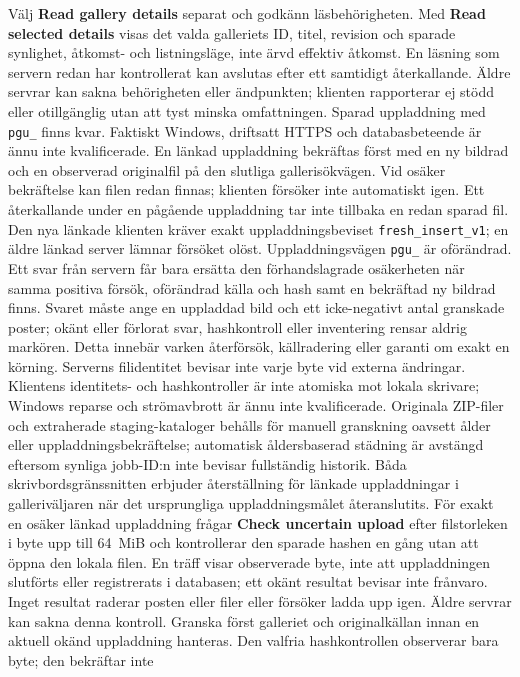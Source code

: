 \documentclass[11pt,a4paper]{article}
\newcommand{\ui}[1]{\textbf{#1}}
\begin{document}
Välj \ui{Read gallery details} separat och godkänn
läsbehörigheten. Med \ui{Read selected details} visas det valda galleriets ID,
titel, revision och sparade synlighet, åtkomst- och listningsläge, inte ärvd
effektiv åtkomst. En läsning som servern redan har kontrollerat kan avslutas
efter ett samtidigt återkallande. Äldre servrar kan sakna behörigheten eller
ändpunkten; klienten rapporterar ej stödd eller otillgänglig utan att tyst
minska omfattningen. Sparad uppladdning med \texttt{pgu\_} finns kvar.
Faktiskt Windows, driftsatt HTTPS och databasbeteende är ännu inte
kvalificerade.
En länkad uppladdning bekräftas först med en ny bildrad och en observerad
originalfil på den slutliga gallerisökvägen. Vid osäker bekräftelse kan filen
redan finnas; klienten försöker inte automatiskt igen. Ett återkallande under
en pågående uppladdning tar inte tillbaka en redan sparad fil.
Den nya länkade klienten kräver exakt uppladdningsbeviset
\texttt{fresh\_insert\_v1}; en äldre länkad server lämnar försöket olöst.
Uppladdningsvägen \texttt{pgu\_} är oförändrad.
Ett svar från servern får bara ersätta den förhandslagrade osäkerheten när
samma positiva försök,
oförändrad källa och hash samt en bekräftad ny bildrad finns. Svaret måste ange
en uppladdad bild och ett icke-negativt antal granskade poster; okänt eller
förlorat svar, hashkontroll eller inventering rensar aldrig markören. Detta
innebär varken återförsök, källradering eller garanti om exakt en körning.
Serverns filidentitet bevisar inte varje byte vid externa ändringar. Klientens
identitets- och hashkontroller är inte atomiska mot lokala skrivare; Windows
reparse och strömavbrott är ännu inte kvalificerade.
Originala ZIP-filer och extraherade staging-kataloger behålls för manuell
granskning oavsett ålder eller uppladdningsbekräftelse; automatisk åldersbaserad
städning är avstängd eftersom synliga jobb-ID:n inte bevisar fullständig historik.
Båda skrivbordsgränssnitten erbjuder återställning för länkade uppladdningar
i galleriväljaren när det ursprungliga uppladdningsmålet återanslutits.
För exakt en osäker länkad uppladdning frågar \ui{Check uncertain upload}
efter filstorleken i byte upp till 64~MiB och kontrollerar den sparade hashen
en gång utan att öppna den lokala filen. En träff
visar observerade byte, inte att uppladdningen slutförts eller registrerats i
databasen; ett okänt resultat bevisar inte frånvaro. Inget resultat raderar
posten eller filer eller försöker ladda upp igen. Äldre servrar kan sakna denna
kontroll.
Granska först galleriet och originalkällan innan en aktuell okänd uppladdning
hanteras. Den valfria hashkontrollen observerar bara byte; den bekräftar inte
\end{document}
